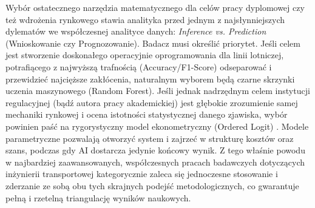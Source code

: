 Wybór ostatecznego narzędzia matematycznego dla celów pracy dyplomowej czy też wdrożenia rynkowego stawia analityka przed jednym z najsłynniejszych dylematów we współczesnej analityce danych: \textit{Inference vs. Prediction} (Wnioskowanie czy Prognozowanie). Badacz musi określić priorytet. Jeśli celem jest stworzenie doskonałego operacyjnie oprogramowania dla linii lotniczej, potrafiącego z najwyższą trafnością (Accuracy/F1-Score) odseparować i przewidzieć najcięższe zakłócenia, naturalnym wyborem będą czarne skrzynki uczenia maszynowego (Random Forest). Jeśli jednak nadrzędnym celem instytucji regulacyjnej (bądź autora pracy akademickiej) jest głębokie zrozumienie samej mechaniki rynkowej i ocena istotności statystycznej danego zjawiska, wybór powinien paść na rygorystyczny model ekonometryczny (Ordered Logit) \cite{albassam2025}. Modele parametryczne pozwalają otworzyć system i zajrzeć w strukturę kosztów oraz szans, podczas gdy AI dostarcza jedynie końcowy wynik. Z tego właśnie powodu w najbardziej zaawansowanych, współczesnych pracach badawczych dotyczących inżynierii transportowej kategorycznie zaleca się jednoczesne stosowanie i zderzanie ze sobą obu tych skrajnych podejść metodologicznych, co gwarantuje pełną i rzetelną triangulację wyników naukowych.